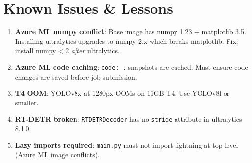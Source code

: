 \documentclass[11pt,a4paper]{article}
\begin{document}
\section{Known Issues \& Lessons}

\begin{enumerate}[nosep]
  \item \textbf{Azure ML numpy conflict}: Base image has numpy 1.23 + matplotlib 3.5. Installing ultralytics upgrades to numpy 2.x which breaks matplotlib. Fix: install numpy$<$2 \textit{after} ultralytics.
  \item \textbf{Azure ML code caching}: \texttt{code: .} snapshots are cached. Must ensure code changes are saved before job submission.
  \item \textbf{T4 OOM}: YOLOv8x at 1280px OOMs on 16GB T4. Use YOLOv8l or smaller.
  \item \textbf{RT-DETR broken}: \texttt{RTDETRDecoder} has no \texttt{stride} attribute in ultralytics 8.1.0.
  \item \textbf{Lazy imports required}: \texttt{main.py} must not import lightning at top level (Azure ML image conflicts).
\end{enumerate}
\end{document}

